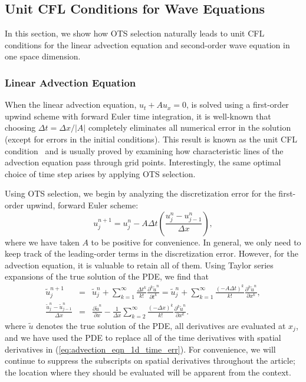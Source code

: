 \documentclass[fleqn,12pt,twoside]{article}
\newcommand{\beq}{\begin{equation}}
\newcommand{\eeq}{\end{equation}}
\newcommand{\bea}{\begin{eqnarray}}
\newcommand{\eea}{\end{eqnarray}}
\def\pt{\partial t}
\def\px{\partial x}
\def\tu{\tilde{u}}
\def\dt{\Delta t}
\def\dx{\Delta x}
\begin{document}
\subsection{Unit CFL Conditions for Wave Equations}
In this section, we show how OTS selection naturally leads to unit CFL 
conditions for the linear advection equation and second-order wave equation 
in one space dimension.  

\subsubsection{Linear Advection Equation}
When the linear advection equation, $u_t + A u_x = 0$,
is solved using a first-order upwind scheme with forward Euler time
integration, it is well-known that choosing $\Delta t = \Delta x / |A|$ 
completely eliminates all numerical error in the solution (except for 
errors in the initial conditions).  This result is known as the unit CFL 
condition~\cite{leveque_book_2002} and is usually proved by examining how 
characteristic lines of the advection equation pass through grid points.  
Interestingly, the same optimal choice of time step arises by applying OTS 
selection.  

Using OTS selection, we begin by analyzing the discretization error for the 
first-order upwind, forward Euler scheme:
\beq
  u^{n+1}_j = u^{n}_j 
  - A \dt \left( \frac{u^{n}_j - u^{n}_{j-1}}{\dx} \right),
  \label{eq:advection_eqn_1d_FD_scheme}
\eeq
where we have taken $A$ to be positive for convenience.  In general, we only 
need to keep track of the leading-order terms in the discretization error.  
However, for the advection equation, it is valuable to retain all of them.  
Using Taylor series expansions of the true solution of the PDE, we find that 
\bea
  \tu^{n+1}_j &=& \tu^{n}_j 
  + \sum_{k=1}^\infty \frac{\dt^k}{k!} 
       \frac{\partial^k \tu^n}{\pt^k} 
  = \tu^{n}_j + \sum_{k=1}^\infty \frac{\left( -A \dt \right)^k}{k!} 
       \frac{\partial^k \tu^n}{\px^k},
  \label{eq:advection_eqn_1d_time_err} 
  \\
  \frac{\tu^{n}_j - \tu^{n}_{j-1}}{\dx} &=& 
  \frac{\partial \tu^n}{\px} 
  - \frac{1}{\dx} \sum_{k=2}^\infty \frac{\left( -\dx \right)^k}{k!} 
       \frac{\partial^k \tu^n}{\px^k}.
  \label{eq:advection_eqn_1d_space_err}
\eea
where $\tu$ denotes the true solution of the PDE, all derivatives are 
evaluated at $x_j$, and we have used the PDE to replace all of the time 
derivatives with spatial derivatives in (\ref{eq:advection_eqn_1d_time_err}).
For convenience, we will continue to suppress the subscripts on spatial
derivatives throughout the article; the location where they should be 
evaluated will be apparent from the context.
\end{document}
